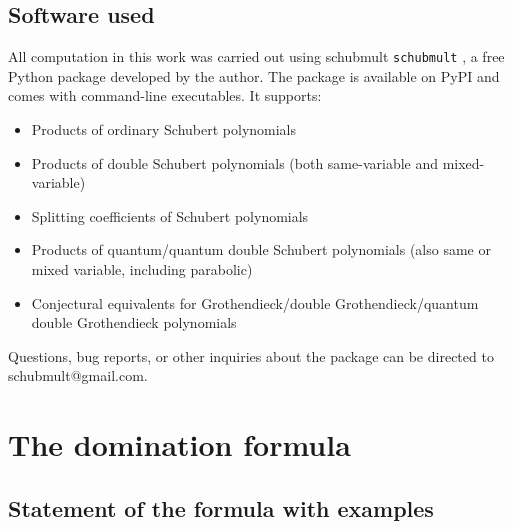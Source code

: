 \documentclass[reqno]{amsart}
\theoremstyle{definition}
\theoremstyle{remark}
\numberwithin{equation}{subsection}
\begin{document}

\subsection*{Software used}

All computation in this work was carried out using schubmult \verb|schubmult| \cite{schubmult},  a free Python package developed by the author. The package is available on PyPI and comes with command-line executables. It supports:
\begin{itemize}
    \item Products of ordinary Schubert polynomials
    \item Products of double Schubert polynomials (both same-variable and mixed-variable)
    \item Splitting coefficients of Schubert polynomials
    \item Products of quantum/quantum double Schubert polynomials (also same or mixed variable, including parabolic)
    \item Conjectural equivalents for Grothendieck/double Grothendieck/quantum double Grothendieck polynomials
\end{itemize}
Questions, bug reports, or other inquiries about the package can be directed to  \href{mailto:schubmult@gmail.com} {}{schubmult@gmail.com}.



\section{The domination formula} \label{section:dualpieri}

\subsection{Statement of the formula with examples}
\end{document}
